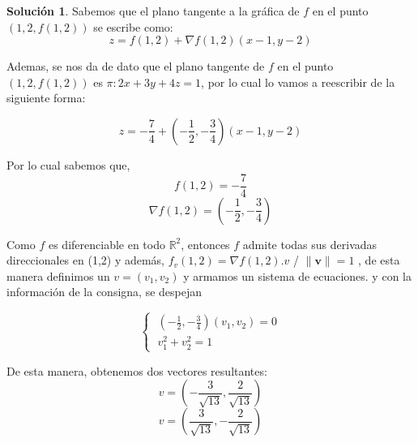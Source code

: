 \documentclass[10pt, a4paper]{report}
\renewcommand{\Re}{\mathbb {R}}
\theoremstyle{definition} %
\newtheorem{solution}{Solución}
\begin{document}

\begin{solution}
Sabemos que el plano tangente a la gráfica de $f$ en el punto $(1,2,f(1,2))$ se escribe como:
\[   
    z= f(1,2) + \nabla f(1,2)(x-1,y-2)
\]

Ademas, se nos da de dato que el plano tangente de $f$ en el punto $(1,2,f(1,2))$ es $\pi:2x+3y+4z=1$, por lo cual lo vamos a reescribir de la siguiente forma:

\[   
z= -\frac{7}{4} + (-\frac{1}{2},-\frac{3}{4})(x-1,y-2)
\]

Por lo cual sabemos que,
\[   
f(1,2)=-\frac{7}{4}
\]
\[
 \nabla f(1,2)=(-\frac{1}{2},-\frac{3}{4})
\]


    Como   $f$ es diferenciable en todo $\Re^2$, entonces $f$ admite todas sus derivadas direccionales en (1,2) y además, $f_v(1,2)=\nabla f(1,2).v$ / $\|\mathbf{v}\|=1$ , de esta manera definimos un $v=(v_1,v_2)$ y armamos un sistema de ecuaciones.
     y con la información de la consigna, se despejan
     
    \[\begin{cases}
            \;(-\frac{1}{2},-\frac{3}{4})(v_1,v_2)=0 \\[5pt]
            \;v_1^2+v_2^2=1
        \end{cases}
    \]
    
    De esta manera, obtenemos dos vectores resultantes:
    \[
    v=(-\frac{3}{\sqrt{13}},\frac{2}{\sqrt{13}})
    \]
     \[
    v=(\frac{3}{\sqrt{13}},-\frac{2}{\sqrt{13}})
    \]
    

\newpage
\end{solution}
\end{document}
